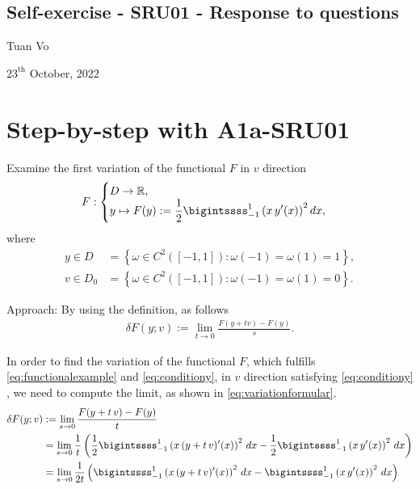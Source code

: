 \documentclass[12pt]{article}
\begin{document}
\begin{center}
	\section*{Self-exercise - SRU01 - Response to questions}
\end{center}
\begin{center}
	Tuan Vo
\end{center}
\begin{center}
	$23^{\text{th}}$ October, 2022
\end{center}
\section{Step-by-step with A1a-SRU01}
\begin{exampleboxed}
	Examine the first variation of the functional $F$ in $v$ direction
	\begin{align}
		\label{eq:functionalexample}
		F:
		\begin{cases}
			D \rightarrow \mathbb{R}, \\
			\displaystyle
			y \mapsto
			F(y):= 
			\frac{1}{2}
			\bigintssss_{-1}^1
			\left( x\,y'(x) \right)^2 dx,
		\end{cases}
	\end{align}
	where 
	\begin{align}
		y \in D     & = \left\{ \omega \in C^2([-1,1]): \omega(-1)=\omega(1)=1 \right\}, 
		\label{eq:conditiony}
		\\
		v \in D_{0} & = \left\{ \omega \in C^2([-1,1]): \omega(-1)=\omega(1)=0 \right\}.
		\label{eq:conditionv}
	\end{align}
\end{exampleboxed}

Approach: By using the definition, as follows 
\begin{align}
	\label{eq:variationformular}
	\boxed{
		\delta F(y;v) := \lim_{t\to 0}\frac{F(y+tv)-F(y)}{s}.
	}
\end{align}

In order to find the variation of the functional $F$,
which fulfills 
\eqref{eq:functionalexample}
and 
\eqref{eq:conditiony},
in $v$ direction satisfying
\eqref{eq:conditiony}
, we need to compute the limit,
as shown in \eqref{eq:variationformular}.
\begin{align}
	\delta F(y;v)
	 & :=  \lim_{s\to 0}\frac{F(y+t\,v)-F(y)}{t} \notag \\
	 & =  \lim_{s\to 0} \frac{1}{t}
	\left(
	\frac{1}{2}
	\bigintssss_{-1}^{1}
	\left(
	x \,
	(y+t\,v)^\prime(x)
	\right)^2\,dx
	-
	\frac{1}{2}
	\bigintssss_{-1}^{1}
	\left(
	x \, y^\prime(x)
	\right)^2\,dx
	\right)\notag                                       \\
	 & =  \lim_{s\to 0} \frac{1}{2t}
	\left(
	\bigintssss_{-1}^{1}
	\left(
	x \,
	(y+t\,v)^\prime(x)
	\right)^2\,dx
	-
	\bigintssss_{-1}^{1}
	\left(
	x \, y^\prime(x)
	\right)^2\,dx
	\right)
\end{align}
\end{document}
